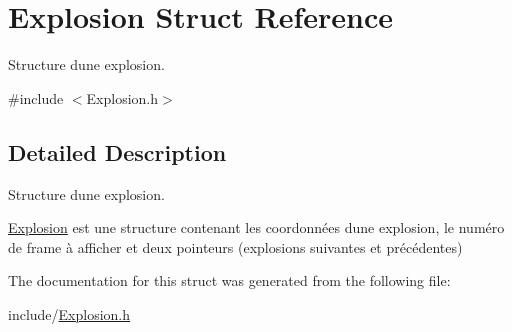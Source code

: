 \hypertarget{struct_explosion}{}\section{Explosion Struct Reference}
\label{struct_explosion}


Structure d\textquotesingle{}une explosion.  




{\ttfamily \#include $<$Explosion.\+h$>$}



\subsection{Detailed Description}
Structure d\textquotesingle{}une explosion. 

\hyperlink{struct_explosion}{Explosion} est une structure contenant les coordonnées d\textquotesingle{}une explosion, le numéro de frame à afficher et deux pointeurs (explosions suivantes et précédentes) 

The documentation for this struct was generated from the following file\+:\begin{DoxyCompactItemize}
\item 
include/\hyperlink{_explosion_8h}{Explosion.\+h}\end{DoxyCompactItemize}
